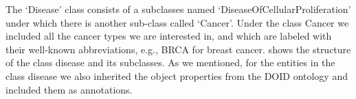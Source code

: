 \hspace*{3.5mm} The `Disease' class consists of a subclasses named  `DiseaseOfCellularProliferation' under which there is another sub-class called `Cancer'. Under the class Cancer we included all the cancer types we are interested in, and which are labeled with their well-known abbreviations, e.g., BRCA for breast cancer.  shows the structure of the class disease and its subclasses. As we mentioned, for the entities in the class disease we also inherited the object properties from the DOID ontology and included them as annotations. 


